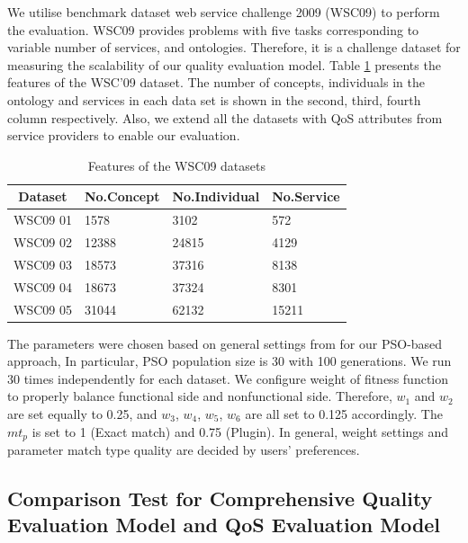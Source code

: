 \documentclass{llncs}
\begin{document}
We utilise benchmark dataset web service challenge 2009 (WSC09) \cite{kona2009wsc} to perform the evaluation. WSC09 provides problems with five tasks corresponding to variable number of services, and ontologies. Therefore, it is a challenge dataset for measuring the scalability of our quality evaluation model. Table \ref{wsc09datasetTable} presents the features of the WSC’09 dataset. The number of concepts, individuals in the ontology and services in each data set is shown in the second, third, fourth column respectively. Also, we extend all the datasets with QoS attributes from service providers to enable our evaluation. 

\begin{table}[]
\centering
\caption{Features of the WSC09 datasets}
\label{wsc09datasetTable}
\begin{tabular}{l|l|l|l}
\hline
\multicolumn{1}{c|}{Dataset} & No.Concept & No.Individual & No.Service \\ \hline
WSC09 01                     & 1578       &3102           &572      \\ \hline
WSC09 02                     & 12388      &24815          &4129      \\ \hline
WSC09 03                     & 18573      &37316          &8138      \\ \hline
WSC09 04                     & 18673      &37324          &8301      \\ \hline
WSC09 05                     & 31044      &62132          &15211    \\ \hline
\end{tabular}
\end{table}

The parameters were chosen based on general settings from \cite{shi2001particle} for our PSO-based approach, In particular, PSO population size is 30 with 100 generations. We run 30 times independently for each dataset. We configure weight of fitness function to properly balance functional side and nonfunctional side. Therefore, $w_{1}$ and $w_{2}$ are set equally to 0.25, and $w_{3}$, $w_{4}$, $w_{5}$, $w_{6}$ are all set to 0.125 accordingly. The $mt_{p}$ is set to 1 (Exact match) and 0.75 (Plugin). In general, weight settings and parameter match type quality are decided by users' preferences.


\subsection{Comparison Test for Comprehensive Quality Evaluation Model and QoS Evaluation Model}\label{comparisonTest}
\end{document}
